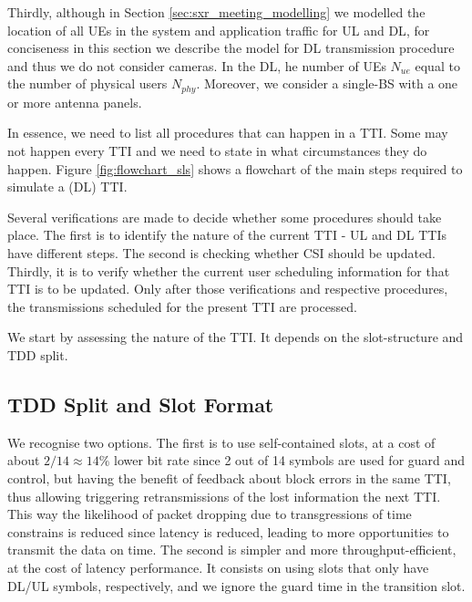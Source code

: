 Thirdly, although in Section \ref{sec:sxr_meeting_modelling} we modelled the location of all \acsp{UE} in the system and application traffic for \acs{UL} and \acs{DL}, for conciseness in this section we describe the model for \acs{DL} transmission procedure and thus we do not consider cameras. In the \acs{DL}, he number of UEs $N_{ue}$ equal to the number of physical users $N_{phy}$. Moreover, we consider a single-BS with a one or more antenna panels.

In essence, we need to list all procedures that can happen in a \acs{TTI}. Some may not happen every \acs{TTI} and we need to state in what circumstances they do happen. Figure \ref{fig:flowchart_sls} shows a flowchart of the main steps required to simulate a (\acs{DL}) \acs{TTI}.


Several verifications are made to decide whether some procedures should take place. The first is to identify the nature of the current \acs{TTI} - UL and DL TTIs have different steps. The second is checking whether CSI should be updated. Thirdly, it is to verify whether the current user scheduling information for that TTI is to be updated. Only after those verifications and respective procedures, the transmissions scheduled for the present TTI are processed. 

We start by assessing the nature of the TTI. It depends on the slot-structure and TDD split.

\subsection*{TDD Split and Slot Format}

We recognise two options. The first is to use self-contained slots, at a cost of about $2/14 \approx 14\%$ lower bit rate since 2 out of 14 symbols are used for guard and control, but having the benefit of feedback about block errors in the same TTI, thus allowing triggering retransmissions of the lost information the next TTI. This way the likelihood of packet dropping due to transgressions of time constrains is reduced since latency is reduced, leading to more opportunities to transmit the data on time. The second is simpler and more throughput-efficient, at the cost of latency performance. It consists on using slots that only have \ac{DL}/\ac{UL} symbols, respectively, and we ignore the guard time in the transition slot.


